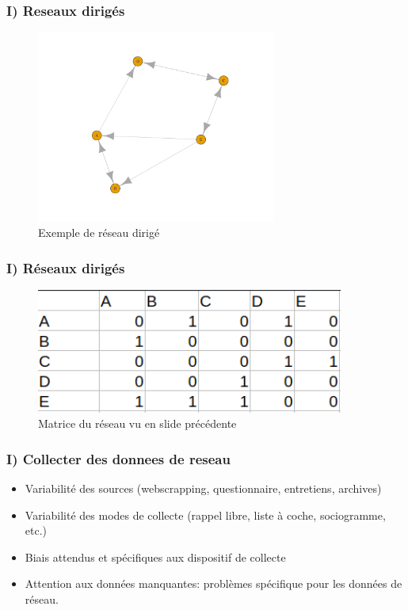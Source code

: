 \documentclass{beamer}
\begin{document}
\begin{frame}
    \frametitle{I) Reseaux dirigés}
    \begin{figure}
        \centering
        \includegraphics[width = 0.7\textwidth]{exemple_graphes_dirige.png}
        \caption{\small{Exemple de réseau dirigé}}
    \end{figure}
\end{frame}

\begin{frame}
    \frametitle{I) Réseaux dirigés}
    \begin{figure}
        \centering
        \includegraphics[width = 0.9\textwidth]{exemple_graphe_dirige_matrice.png}
        \caption{\small{Matrice du réseau vu en slide précédente}}
      \end{figure}
\end{frame}

\begin{frame}
    \frametitle{I) Collecter des donnees de reseau}
    \begin{itemize}
        \item Variabilité des sources (webscrapping, questionnaire, entretiens, archives)
        \item Variabilité des modes de collecte (rappel libre, liste à coche, sociogramme, etc.)
        \item Biais attendus et spécifiques aux dispositif de collecte
        \item Attention aux données manquantes: problèmes spécifique pour les données de réseau.
    \end{itemize}
\end{frame}
\end{document}
